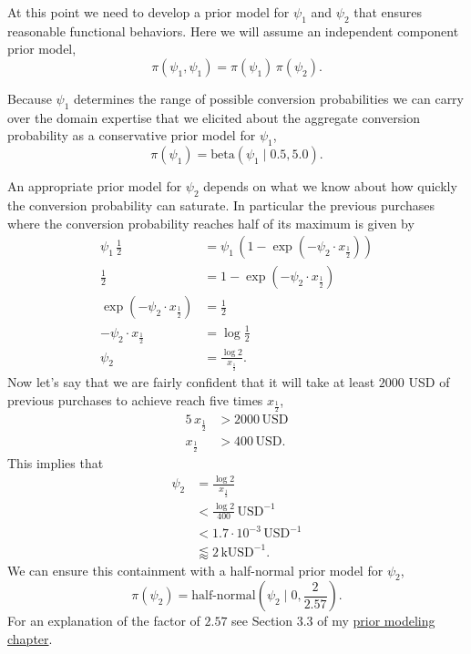\documentclass[
  letterpaper,
  DIV=11,
  numbers=noendperiod]{scrartcl}
\begin{document}
At this point we need to develop a prior model for \(\psi_{1}\) and
\(\psi_{2}\) that ensures reasonable functional behaviors. Here we will
assume an independent component prior model, \[
\pi( \psi_{1}, \psi_{1}) = \pi(\psi_{1}) \, \pi(\psi_{2}).
\]

Because \(\psi_{1}\) determines the range of possible conversion
probabilities we can carry over the domain expertise that we elicited
about the aggregate conversion probability as a conservative prior model
for \(\psi_{1}\), \[
\pi( \psi_{1} ) = \mathrm{beta}( \psi_{1} \mid 0.5, 5.0).
\]

An appropriate prior model for \(\psi_{2}\) depends on what we know
about how quickly the conversion probability can saturate. In particular
the previous purchases where the conversion probability reaches half of
its maximum is given by \begin{align*}
\psi_{1} \, \frac{1}{2}
&=
\psi_{1} \,
\left( 1 - \exp \left( - \psi_{2} \cdot x_{\frac{1}{2}} \right) \right)
\\
\frac{1}{2}
&=
1 - \exp \left(- \psi_{2} \cdot x_{\frac{1}{2}} \right)
\\
\exp \left(- \psi_{2} \cdot x_{\frac{1}{2}} \right)
&=
\frac{1}{2}
\\
- \psi_{2} \cdot x_{\frac{1}{2}}
&=
\log \frac{1}{2}
\\
\psi_{2}
&=
\frac{\log 2}{x_{\frac{1}{2}}}.
\end{align*} Now let's say that we are fairly confident that it will
take at least \(2000\) USD of previous purchases to achieve reach five
times \(x_{\frac{1}{2}}\), \begin{align*}
5 \, x_{\frac{1}{2}} &> 2000 \, \mathrm{USD}
\\
x_{\frac{1}{2}} &> 400 \, \mathrm{USD}.
\end{align*} This implies that \begin{align*}
\psi_{2}
&=
\frac{\log 2}{x_{\frac{1}{2}}}
\\
&<
\frac{\log 2}{400} \, \mathrm{USD}^{-1}
\\
&<
1.7 \cdot 10^{-3} \, \mathrm{USD}^{-1}
\\
&\lessapprox 2 \, \mathrm{kUSD}^{-1}.
\end{align*} We can ensure this containment with a half-normal prior
model for \(\psi_{2}\), \[
\pi( \psi_{2} )
=
\text{half-normal} \left( \psi_{2} \mid 0, \frac{2}{2.57} \right).
\] For an explanation of the factor of \(2.57\) see Section 3.3 of my
\href{https://betanalpha.github.io/assets/case_studies/prior_modeling.html}{prior
modeling chapter}.
\end{document}
